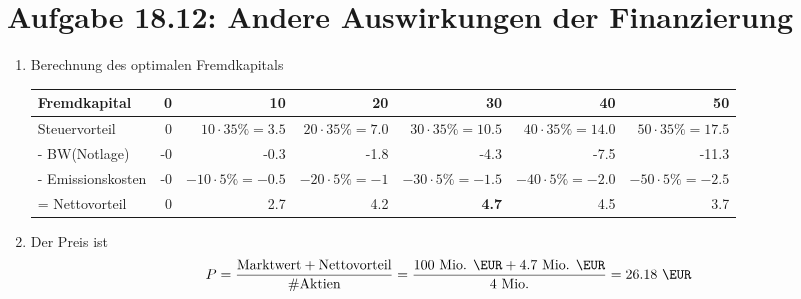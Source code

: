 \documentclass{article}
\begin{document}
	\section*{Aufgabe 18.12: Andere Auswirkungen der Finanzierung}
	\begin{enumerate}[label=(\alph*)]
		\item Berechnung des optimalen Fremdkapitals
		\begin{center}
			\begin{tabular}{l|r|r|r|r|r|r}
				\textbf{Fremdkapital} & \textbf{0} & \textbf{10} & \textbf{20} & \textbf{30} & \textbf{40} & \textbf{50} \\
				\hline
				Steuervorteil & 0 & $10\cdot 35\%=3.5$ & $20\cdot 35\%=7.0$ & $30\cdot 35\%=10.5$ & $40\cdot 35\%=14.0$ & $50\cdot 35\%=17.5$ \\
				\hline
				- BW(Notlage) & -0 & -0.3 & -1.8 & -4.3 & -7.5 & -11.3 \\
				\hline
				- Emissionskosten & -0 & $-10\cdot 5\%=-0.5$ & $-20\cdot 5\%=-1$ & $-30\cdot 5\%=-1.5$ & $-40\cdot 5\%=-2.0$ & $-50\cdot 5\%=-2.5$ \\
				\hline
				= Nettovorteil & 0 & 2.7 & 4.2 & \textbf{4.7} & 4.5 & 3.7
			\end{tabular}
		\end{center}
		\item Der Preis ist
		\begin{align}
			P = \frac{\text{Marktwert} + \text{Nettovorteil}}{\#\text{Aktien}} = \frac{100\text{ Mio. \EUR}+4.7\text{ Mio. \EUR}}{4\text{ Mio.}}=26.18\text{ \EUR} \notag
		\end{align}
	\end{enumerate}
	
\end{document}
